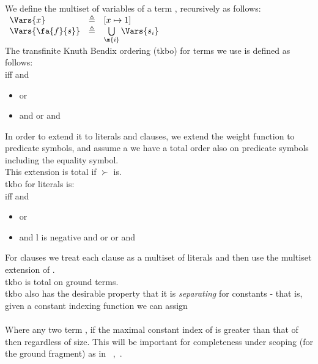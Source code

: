 We define the multiset of variables of a term ,  recursively as follows:\\
$ 
\begin{array}{lll}
	\Vars{x}         & \triangleq & [x \mapsto 1]\\
	\Vars{\fa{f}{s}} & \triangleq & \bigcup\limits_\m{i} \Vars{s_i}\\
\end{array} 
$\\
\bigskip
The transfinite Knuth Bendix ordering (tkbo) for terms we use is defined as follows:\\
 iff  and
\begin{itemize}
	\item {} or
	\item {} and
		\subitem {} or
		\subitem {} and 
\end{itemize}

In order to extend it to literals and clauses, we extend the weight function to predicate symbols, and assume a we have a total order  also on predicate symbols including the equality symbol.\\
This extension is total if $\succ$ is.\\
tkbo for literals is:\\
 iff  and
\begin{itemize}
	\item {} or
	\item {} and
		\subitem l is negative and  or
		\subitem {} or
		\subitem {} and 
\end{itemize}
For clauses we treat each clause as a multiset of literals and then use the multiset extension of .\\
tkbo is total on ground terms.\\
tkbo also has the desirable property that it is \emph{separating} for constants - 
that is, given a constant indexing function  we can assign \\
\\
Where any two term , if the maximal constant index of  is greater than that of  then  regardless of size.
This will be important for completeness under scoping (for the ground fragment) as in ~\cite{KovacsVoronkov09},~\cite{McMillan08}.


